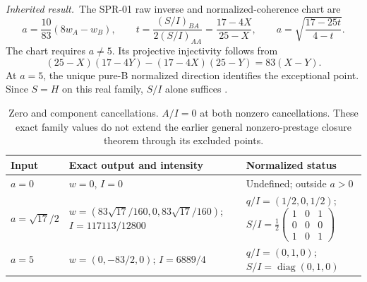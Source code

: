 \documentclass[11pt,a4paper]{article}
\newcommand{\diag}{\operatorname{diag}}\newcommand{\Argz}{\operatorname{Arg}_0}
\newcommand{\inherited}{\textit{Inherited result.}}
\begin{document}
\inherited\ The SPR-01 raw inverse and normalized-coherence chart are
\begin{equation}
a=\frac{10}{83}(8w_A-w_B),\qquad
t=\frac{(S/I)_{BA}}{2(S/I)_{AA}}=\frac{17-4X}{25-X},\qquad
a=\sqrt{\frac{17-25t}{4-t}}.\label{eq:inverses}
\end{equation}
The chart requires $a\ne5$. Its projective injectivity follows from
\begin{equation}
(25-X)(17-4Y)-(17-4X)(25-Y)=83(X-Y).\label{eq:projective}
\end{equation}
At $a=5$, the unique pure-B normalized direction identifies the exceptional point. Since $S=H$ on this real family, $S/I$ alone suffices \cite{spr01}.

\begin{table}[htbp]\centering\small
\begin{tabular}{P{.16\linewidth}P{.41\linewidth}P{.33\linewidth}}\toprule
Input & Exact output and intensity & Normalized status\\\midrule
$a=0$ & $w=0$, $I=0$ & Undefined; outside $a>0$\\
$a=\sqrt{17}/2$ & $w=(83\sqrt{17}/160,0,83\sqrt{17}/160)$; $I=117113/12800$ & $q/I=(1/2,0,1/2)$; $S/I=\tfrac12\left(\begin{smallmatrix}1&0&1\\0&0&0\\1&0&1\end{smallmatrix}\right)$\\
$a=5$ & $w=(0,-83/2,0)$; $I=6889/4$ & $q/I=(0,1,0)$; $S/I=\diag(0,1,0)$\\\bottomrule
\end{tabular}
\caption{Zero and component cancellations. $A/I=0$ at both nonzero cancellations. These exact family values do not extend the earlier general nonzero-prestage closure theorem through its excluded points.}
\label{tab:domains}
\end{table}

\clearpage
\end{document}
